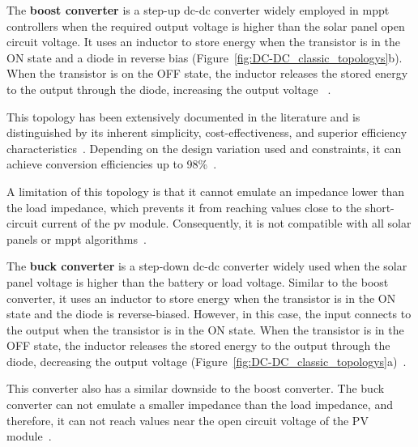             The \textbf{boost converter} is a step-up \acs{dc}-\acs{dc} converter widely employed in \ac{mppt} controllers when the required output voltage is higher than the solar panel open circuit voltage. 
            It uses an inductor to store energy when the transistor is in the ON state and a diode in reverse bias (Figure~\ref{fig:DC-DC_classic_topologys}b). When the transistor is on the OFF state, the inductor releases the stored energy to the output through the diode, increasing the output voltage ~\cite{Non_Isolated_DC_DC_Converters_MPPT_Controller_2021}.

            This topology has been extensively documented in the literature and is distinguished by its inherent simplicity, cost-effectiveness, and superior efficiency characteristics~\cite{shahira2022_electrical_design_solar_boat}\cite{Look-Up-Table_VS_PeO}\cite{Intelligent_PV_Module_2006}. Depending on the design variation used and constraints, it can achieve conversion efficiencies up to 98\%~\cite{Review_Isolated_Non_isolated_DC_DC_Converter_PV_Application_2018}. 

            A limitation of this topology is that it cannot emulate an impedance lower than the load impedance, which prevents it from reaching values close to the short-circuit current of the \acs{pv} module. Consequently, it is not compatible with all solar panels or \acs{mppt} algorithms~\cite{Review_Isolated_Non_isolated_DC_DC_Converter_PV_Application_2018,A_New_Application_Buck_Boost_Converters_IV_Curve_PV_Modules_2007}.


            The \textbf{buck converter} is a step-down \acs{dc}-\acs{dc} converter widely used when the solar panel voltage is higher than the battery or load voltage. Similar to the boost converter, it uses an inductor to store energy when the transistor is in the ON state and the diode is reverse-biased. However, in this case, the input connects to the output when the transistor is in the ON state. When the transistor is in the OFF state, the inductor releases the stored energy to the output through the diode, decreasing the output voltage (Figure~\ref{fig:DC-DC_classic_topologys}a)~\cite{Review_Isolated_Non_isolated_DC_DC_Converter_PV_Application_2018}.

            This converter also has a similar downside to the boost converter. The buck converter can not emulate a smaller impedance than the load impedance, and therefore, it can not reach values near the open circuit voltage of the PV module~\cite{Review_Isolated_Non_isolated_DC_DC_Converter_PV_Application_2018}\cite{A_New_Application_Buck_Boost_Converters_IV_Curve_PV_Modules_2007}.

